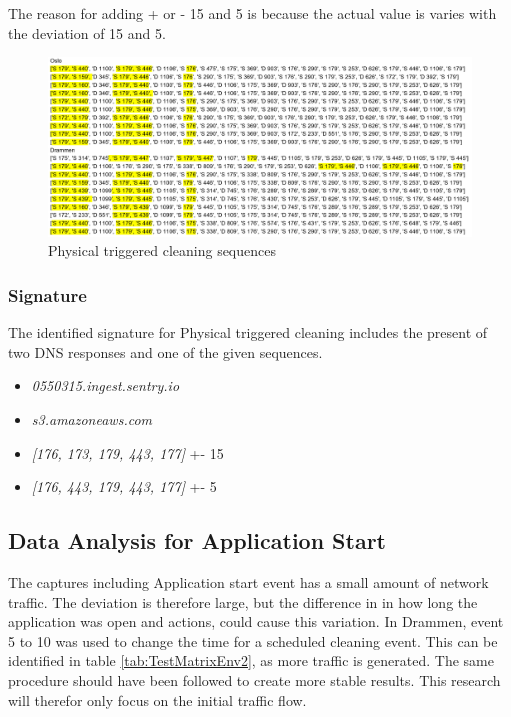 The reason for adding + or - 15 and 5 is because the actual value is varies with the deviation of 15 and 5.

\begin{figure}[H]
    \centering
    \includegraphics[width=\textwidth]{figures/Sequence_PC.png}
    \caption{Physical triggered cleaning sequences}
    \label{fig:PCseq}
\end{figure}

\subsubsection{Signature}
The identified signature for Physical triggered cleaning includes the present of two DNS responses and one of the given sequences.  

\begin{itemize}
    \item \textit{0550315.ingest.sentry.io}
    \item \textit{s3.amazoneaws.com}
    \item \textit{[176, 173, 179, 443, 177]} +- 15
    \item \textit{[176, 443, 179, 443, 177]} +- 5
\end{itemize}

\subsection{Data Analysis for Application Start}
The captures including Application start event has a small amount of network traffic. The deviation is therefore large, but the difference in in how long the application was open and actions, could cause this variation. In Drammen, event 5 to 10 was used to change the time for a scheduled cleaning event. This can be identified in table \ref{tab:TestMatrixEnv2}, as more traffic is generated. The same procedure should have been followed to create more stable results. This research will therefor only focus on the initial traffic flow.


